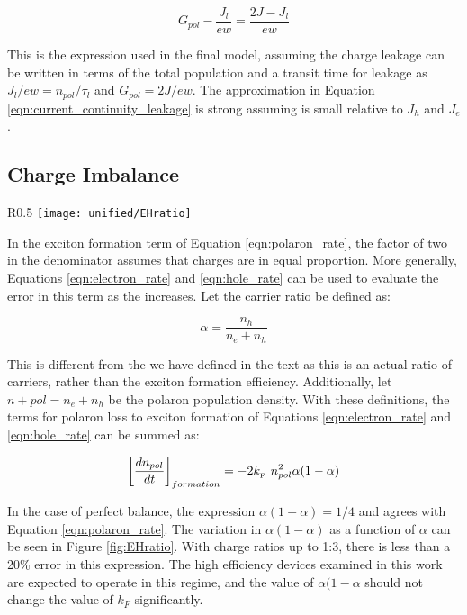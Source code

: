\documentclass[../thesis.tex]{subfiles}
\begin{document}
\begin{equation}
G_{pol}-\frac{J_l}{ew}=\frac{2J-J_l}{ew}
\label{polaron_generation}
\end{equation}

This is the expression used in the final model, assuming the charge leakage can be written in terms of the total population and a transit time for leakage as  $J_l/ew=n_{pol}/\tau_l$ and $G_{pol}=2J/ew$.  
The approximation in Equation \ref{eqn:current_continuity_leakage} is strong assuming  is small relative to  $J_h$ and $J_e$.

\subsection{Charge Imbalance} \label{sec:charge_imbalance}

\begin{wrapfigure}[14]{R}{0.5\textwidth}
\centering
\texttt{[image: unified/EHratio]}
\caption{The quantity $\alpha(1-\alpha)$ is plotted as a function of the polaron composition, $\alpha$ and the electron to hole ratio.}
\label{fig:EHratio}
\end{wrapfigure}

In the exciton formation term of Equation \ref{eqn:polaron_rate}, the factor of two in the denominator assumes that charges are in equal proportion.  
More generally, Equations \ref{eqn:electron_rate} and \ref{eqn:hole_rate} can be used to evaluate the error in this term as the \ef increases.  
Let the carrier ratio be defined as:

\begin{equation}
\alpha=\frac{n_h}{n_e+n_h}
\label{eqn:charge_ratio}
\end{equation}

This is different from the \ef we have defined in the text as this is an actual ratio of carriers, rather than the exciton formation efficiency.  
Additionally, let  $n+{pol}=n_e+n_h$ be the polaron population density.  
With these definitions, the terms for polaron loss to exciton formation of Equations \ref{eqn:electron_rate} and \ref{eqn:hole_rate} can be summed as:

\begin{equation}
\left[\frac{dn_{pol}}{dt}\right]_{formation}=-2k_{_\text{\tiny F}}\  n_{pol}^2\alpha(1-\alpha)
\label{eqn:exciton_formation_charge_ratio}
\end{equation}

In the case of perfect balance, the expression  $\alpha(1-\alpha)=1/4$ and agrees with Equation \ref{eqn:polaron_rate}.  
The variation in $\alpha(1-\alpha)$ as a function of $\alpha$  can be seen in Figure \ref{fig:EHratio}.  
With charge ratios up to 1:3, there is less than a 20\% error in this expression.  
The high efficiency devices examined in this work are expected to operate in this regime, and the value of  $\alpha(1-\alpha$ should not change the value of  $k_F$ significantly.
\end{document}
